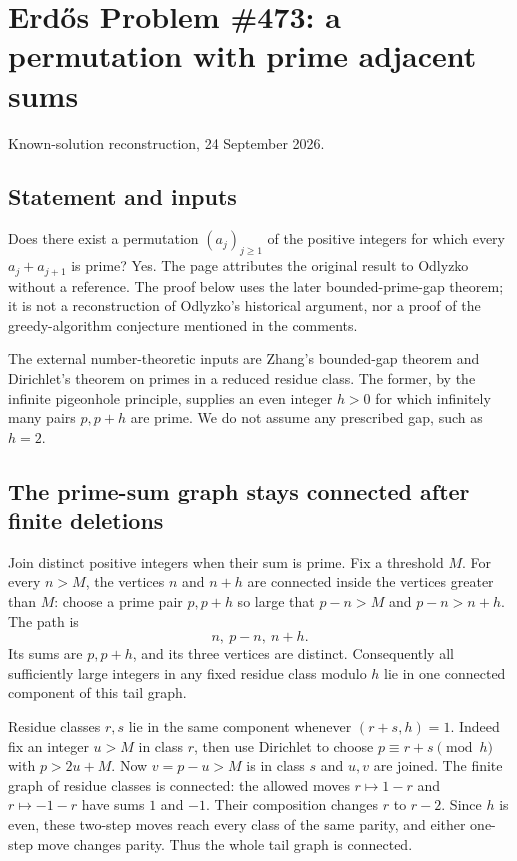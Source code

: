 \section{Erd\H{o}s Problem \#473: a permutation with prime adjacent sums}
\noindent Known-solution reconstruction, 24 September 2026.

\subsection*{Statement and inputs}
Does there exist a permutation $(a_j)_{j\ge1}$ of the positive integers for which every $a_j+a_{j+1}$ is prime? Yes. The page attributes the original result to Odlyzko without a reference. The proof below uses the later bounded-prime-gap theorem; it is not a reconstruction of Odlyzko's historical argument, nor a proof of the greedy-algorithm conjecture mentioned in the comments.

The external number-theoretic inputs are Zhang's bounded-gap theorem and Dirichlet's theorem on primes in a reduced residue class. The former, by the infinite pigeonhole principle, supplies an even integer $h>0$ for which infinitely many pairs $p,p+h$ are prime. We do not assume any prescribed gap, such as $h=2$.

\subsection*{The prime-sum graph stays connected after finite deletions}
Join distinct positive integers when their sum is prime. Fix a threshold $M$. For every $n>M$, the vertices $n$ and $n+h$ are connected inside the vertices greater than $M$: choose a prime pair $p,p+h$ so large that $p-n>M$ and $p-n>n+h$. The path is
\[n,\ p-n,\ n+h.\]
Its sums are $p,p+h$, and its three vertices are distinct. Consequently all sufficiently large integers in any fixed residue class modulo $h$ lie in one connected component of this tail graph.

Residue classes $r,s$ lie in the same component whenever $(r+s,h)=1$. Indeed fix an integer $u>M$ in class $r$, then use Dirichlet to choose $p\equiv r+s\pmod h$ with $p>2u+M$. Now $v=p-u>M$ is in class $s$ and $u,v$ are joined. The finite graph of residue classes is connected: the allowed moves $r\mapsto1-r$ and $r\mapsto-1-r$ have sums $1$ and $-1$. Their composition changes $r$ to $r-2$. Since $h$ is even, these two-step moves reach every class of the same parity, and either one-step move changes parity. Thus the whole tail graph is connected.

